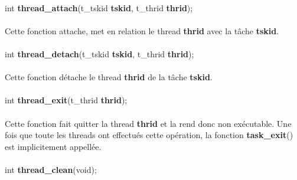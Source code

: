 \documentclass[10pt,a4wide]{article}
\begin{document}
\paragraph{}

\hspace{1.5cm}int \textbf{thread\_attach}(t\_tskid \textbf{tskid},
                                          t\_thrid \textbf{thrid});

\paragraph{}

Cette fonction attache, met en relation le thread \textbf{thrid} avec
la t\^ache \textbf{tskid}.

\paragraph{}

\hspace{1.5cm}int \textbf{thread\_detach}(t\_tskid \textbf{tskid},
                                          t\_thrid \textbf{thrid});

\paragraph{}

Cette fonction d\'etache le thread \textbf{thrid} de la t\^ache
\textbf{tskid}.

\paragraph{}

\hspace{1.5cm}int \textbf{thread\_exit}(t\_thrid \textbf{thrid});

\paragraph{}

Cette fonction fait quitter la thread \textbf{thrid} et la rend donc
non ex\'ecutable. Une fois que toute les threads ont effectu\'es cette
op\'eration, la fonction \textbf{task\_exit}() est implicitement
appell\'ee.

\paragraph{}

\hspace{1.5cm}int \textbf{thread\_clean}(void);
\end{document}
